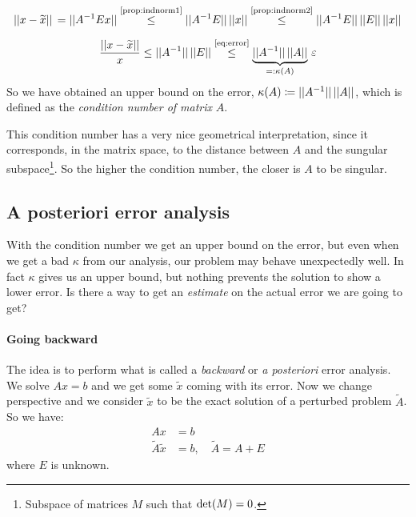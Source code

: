 \begin{dmath*}
	||x-\tilde{x}||\, = ||A^{-1} E x|| \stackrel{\scriptsize{\eqref{prop:indnorm1}}}{\leq} ||A^{-1}E||\,||x|| \stackrel{\scriptsize{\eqref{prop:indnorm2}}}{\leq} ||A^{-1}E||\,||E||\,||x||
\end{dmath*}{
\begin{dmath*}
	\frac{||x - \tilde{x}||}{x} \leq ||A^{-1}||\,||E|| \stackrel{\scriptsize{\eqref{eq:error}}}{\leq} \underbrace{||A^{-1}||\,||A||}_{=: \kappa(A)}\,\eps
\end{dmath*}
So we have obtained an upper bound on the error, $\kappa(A) \coloneqq ||A^{-1}||\,||A||$, which is defined as the \emph{condition number of matrix} $A$.
\begin{Rem}
	This condition number has a very nice geometrical interpretation, since it corresponds, in the matrix space, to the distance between $A$ and the sungular subspace\footnote{Subspace of matrices $M$ such that $\operatorname{det}(M) = 0$.}. So the higher the condition number, the closer is $A$ to be singular.
\end{Rem}

\subsection{A posteriori error analysis}
With the condition number we get an upper bound on the error, but even when we get a bad $\kappa$ from our analysis, our problem may behave unexpectedly well. In fact $\kappa$ gives us an upper bound, but nothing prevents the solution to show a lower error. Is there a way to get an \emph{estimate} on the actual error we are going to get?

\paragraph{Going backward}
The idea is to perform what is called a \emph{backward} or \emph{a posteriori} error analysis.
We solve $Ax = b$ and we get some $\tilde{x}$ coming with its error. Now we change perspective and we consider $\tilde{x}$ to be the exact solution of a perturbed problem $\tilde{A}$. So we have:
\begin{align*}
	Ax &= b\\
	\tilde{A} \tilde{x} &= b, \quad \tilde{A} = A + E
\end{align*}
where $E$ is unknown.

}
